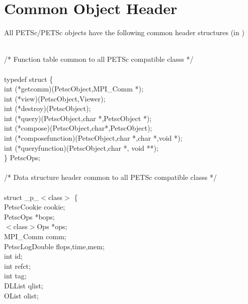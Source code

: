 \documentclass[twoside,12pt]{../sty/report_petsc}
\begin{document}
\section{Common Object Header}

All PETSc/PETSc objects have the following common header structures
(in )

\begin{tabbing}
\\
/* Function table common to all PETSc compatible classs */\\
\\
typedef struct \{ \\
   int (*getcomm)(PetscObject,MPI\_Comm *);\\
   int (*view)(PetscObject,Viewer);\\
   int (*destroy)(PetscObject);\\
   int (*query)(PetscObject,char *,PetscObject *);\\
   int (*compose)(PetscObject,char*,PetscObject);\\
   int (*composefunction)(PetscObject,char *,char *,void *);\\
   int (*queryfunction)(PetscObject,char *, void **);\\
\} PetscOps;\\
\\
/* Data structure header common to all PETSc compatible classs */\\
\\
struct \_p\_$<$class$>$ \{\\
  PetscCookie      cookie;                                  \\
  PetscOps         *bops;                                   \\
  $<$class$>$Ops       *ops;                                    \\
  MPI\_Comm         comm;                                    \\
  PetscLogDouble  flops,time,mem;                          \\
  int              id;                                      \\
  int              refct;                                   \\
  int              tag;                                     \\
  DLList           qlist;                                   \\
  OList            olist;                                   \\

\end{tabbing}
\end{document}
